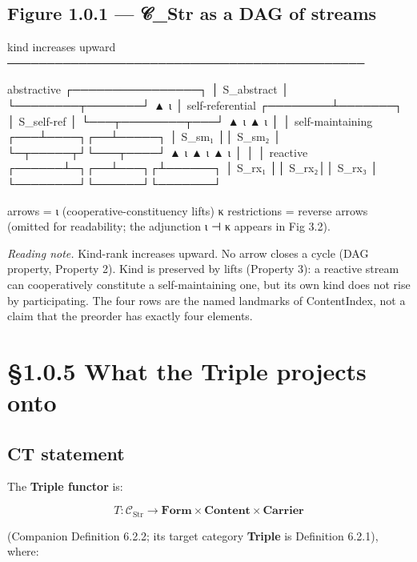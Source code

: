 \documentclass[11pt, openany]{book}
\newcommand{\sectionbreak}{\clearpage}
\begin{document}
\subsection{Figure 1.0.1 --- 𝒞\_\allowbreak{}Str as a DAG of streams}

\begin{Code}
kind increases upward
─────────────────────────────────────────────

  abstractive     ┌────────────────┐
                  │   S_abstract   │
                  └────────┬───────┘
                           ▲ ι
                           │
  self-referential ┌────────┴───────┐
                   │   S_self-ref   │
                   └───┬────────┬───┘
                       ▲ ι      ▲ ι
                       │        │
  self-maintaining ┌───┴────┐┌──┴─────┐
                   │ S_sm₁  ││ S_sm₂  │
                   └─┬─────┬┘└───┬────┘
                     ▲ ι   ▲ ι   ▲ ι
                     │     │     │
  reactive    ┌──────┴─┐┌──┴───┐┌┴──────┐
              │ S_rx₁  ││ S_rx₂││ S_rx₃ │
              └────────┘└──────┘└───────┘

arrows = ι (cooperative-constituency lifts)
κ restrictions = reverse arrows (omitted for
readability; the adjunction ι ⊣ κ appears in
Fig 3.2).
\end{Code}

\textit{Reading note.} Kind-rank increases upward. No arrow closes a cycle (DAG property, Property 2). Kind is preserved by lifts (Property 3): a reactive stream can cooperatively constitute a self-maintaining one, but its own kind does not rise by participating. The four rows are the named landmarks of ContentIndex, not a claim that the preorder has exactly four elements.

\sectionbreak

\section{§1.0.5 What the Triple projects onto}

\subsection{CT statement}

The \textbf{Triple functor} is:

$$T : \mathcal{C}_{\text{Str}} \to \mathbf{Form} \times \mathbf{Content} \times \mathbf{Carrier}$$

(Companion Definition 6.2.2; its target category \textbf{Triple} is Definition 6.2.1), where:
\end{document}
